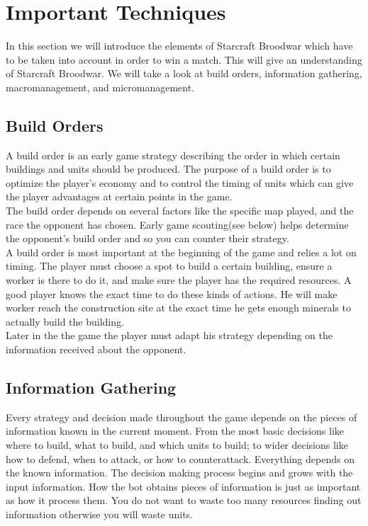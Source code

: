 \section{Important Techniques}
In this section we will introduce the elements of Starcraft Broodwar which have to be taken into account in order to win a match. This will give an understanding 
of Starcraft Broodwar. We will take a look at build orders, information gathering, macromanagement, and
micromanagement.

	\subsection{Build Orders}
		A build order is an early game strategy describing the order in which certain buildings and units should be produced\cite{wiki_build_order}. 
		The purpose of a build order is to optimize the player's economy and to control the timing of units which can give 
		the player advantages at certain points in the game.\\
		The build order depends on several factors like the specific map played, and the race the opponent has chosen. 
		Early game scouting(see below) helps determine the opponent's build order and so you can counter their strategy.\\
		
		A build order is most important at the beginning of the game and relies a lot on timing. 
		The player must choose a spot to build a certain building, ensure a worker is there to do it, 
		and make sure the player has the required resources. 
		A good player knows the exact time to do these kinds of actions. 
		He will make worker reach the construction site at the exact time he gets enough minerals to actually build the building.\\
		
		Later in the the game the player must adapt his strategy depending on the information received about the opponent.
	
	\subsection{Information Gathering}
		Every strategy and decision made throughout the game depends on the pieces of information 
		known in the current moment. From the most basic decisions like where to build, what to build, and
		which units to build; to wider decisions like how to defend, when to attack, or how to counterattack.
		Everything depends on the known information. The decision making process begins and grows with the input information.
		How the bot obtains pieces of information is just as important 
		as how it process them. You do not want to waste too many resources finding out information otherwise you will waste units. 
	
